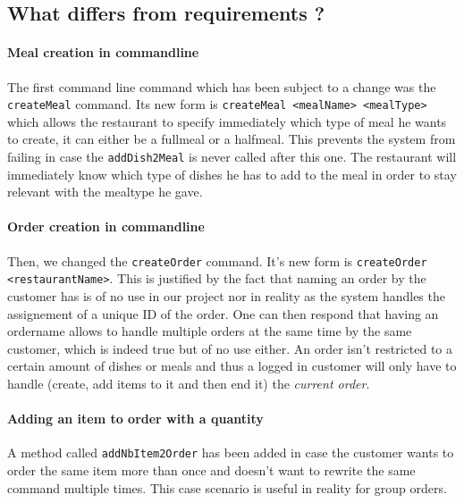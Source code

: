 \subsection{What differs from requirements ?} %
\label{sub:what_differs_from_requirements}

\paragraph{Meal creation in commandline} %
\label{par:meal_creation_in_commandline}
The first command line command which has been subject to a change
was the \lstinline|createMeal| command. Its new form is
\lstinline|createMeal <mealName> <mealType>|
which allows the restaurant to specify immediately which type of meal
he wants to create, it can either be a fullmeal or a halfmeal.
This prevents the system from failing in case the \lstinline|addDish2Meal|
is never called after this one.
The restaurant will immediately know which type of dishes he has to add
to the meal in order to stay relevant with the mealtype he gave. 

\paragraph{Order creation in commandline} %
\label{par:order_creation_in_commandline}
Then, we changed the \lstinline|createOrder| command. It's new form is
\lstinline|createOrder <restaurantName>|.
This is justified by the fact that naming an order by the customer
has is of no use in our project nor in reality as the system
handles the assignement of a unique ID of the order.
One can then respond that having an ordername allows to handle
multiple orders at the same time by the same customer,
which is indeed true but of no use either.
An order isn't restricted to a certain amount of dishes
or meals and thus a logged in customer will only
have to handle (create, add items to it and then end it)
the \emph{current order}.

\paragraph{Adding an item to order with a quantity} %
\label{par:add_an_item_to_order_with_a_quantity}
A method called \lstinline|addNbItem2Order| has been added
in case the customer wants to order the same item more than once
and doesn't want to rewrite the same command multiple times.
This case scenario is useful in reality for group orders.

